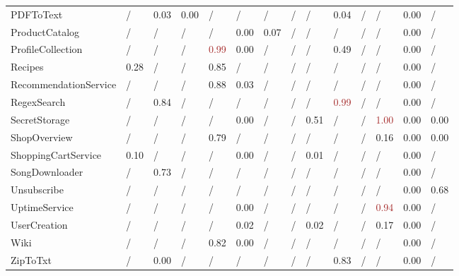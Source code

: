 \begin{table*}[h]
{\begin{tabular}{
l
x{1}{2}
x{1}{2}
x{1}{2}
x{1}{2}
x{1}{2}
x{1}{2}
x{1}{2}
x{1}{2}
x{1}{2}
x{1}{2}
x{1}{2}
x{1}{2}
x{1}{2}
}
PDFToText & / & 0.03 & 0.00 & / & / & / & / & / & 0.04 & / & / & 0.00 & / \\
ProductCatalog & / & / & / & / & 0.00 & 0.07 & / & / & / & / & / & 0.00 & / \\
ProfileCollection & / & / & / & \textcolor{brown}{0.99} & 0.00 & / & / & / & 0.49 & / & / & 0.00 & / \\
Recipes & 0.28 & / & / & 0.85 & / & / & / & / & / & / & / & 0.00 & / \\
RecommendationService & / & / & / & 0.88 & 0.03 & / & / & / & / & / & / & 0.00 & / \\
RegexSearch & / & 0.84 & / & / & / & / & / & / & \textcolor{brown}{0.99} & / & / & 0.00 & / \\
SecretStorage & / & / & / & / & 0.00 & / & / & 0.51 & / & / & \textcolor{brown}{1.00} & 0.00 & 0.00 \\
ShopOverview & / & / & / & 0.79 & / & / & / & / & / & / & 0.16 & 0.00 & 0.00 \\
ShoppingCartService & 0.10 & / & / & / & 0.00 & / & / & 0.01 & / & / & / & 0.00 & / \\
SongDownloader & / & 0.73 & / & / & / & / & / & / & / & / & / & 0.00 & / \\
Unsubscribe & / & / & / & / & / & / & / & / & / & / & / & 0.00 & 0.68 \\
UptimeService & / & / & / & / & 0.00 & / & / & / & / & / & \textcolor{brown}{0.94} & 0.00 & / \\
UserCreation & / & / & / & / & 0.02 & / & / & 0.02 & / & / & 0.17 & 0.00 & / \\
Wiki & / & / & / & 0.82 & 0.00 & / & / & / & / & / & / & 0.00 & / \\
ZipToTxt & / & 0.00 & / & / & / & / & / & / & 0.83 & / & / & 0.00 & / \\
\bottomrule
\end{tabular}}
\end{table*}
